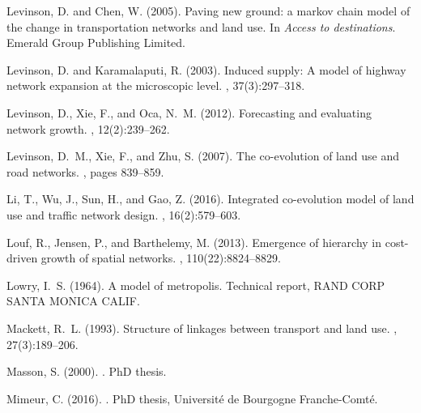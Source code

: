 \documentclass[10pt]{article}
\begin{document}
\begin{thebibliography}{}
Levinson, D. and Chen, W. (2005).
\newblock Paving new ground: a markov chain model of the change in
  transportation networks and land use.
\newblock In {\em Access to destinations}. Emerald Group Publishing Limited.

Levinson, D. and Karamalaputi, R. (2003).
\newblock Induced supply: A model of highway network expansion at the
  microscopic level.
,
  37(3):297--318.

Levinson, D., Xie, F., and Oca, N.~M. (2012).
\newblock Forecasting and evaluating network growth.
, 12(2):239--262.

Levinson, D.~M., Xie, F., and Zhu, S. (2007).
\newblock The co-evolution of land use and road networks.
, pages 839--859.

Li, T., Wu, J., Sun, H., and Gao, Z. (2016).
\newblock Integrated co-evolution model of land use and traffic network design.
, 16(2):579--603.

Louf, R., Jensen, P., and Barthelemy, M. (2013).
\newblock Emergence of hierarchy in cost-driven growth of spatial networks.
,
  110(22):8824--8829.

Lowry, I.~S. (1964).
\newblock A model of metropolis.
\newblock Technical report, RAND CORP SANTA MONICA CALIF.

Mackett, R.~L. (1993).
\newblock Structure of linkages between transport and land use.
, 27(3):189--206.

Masson, S. (2000).
.
\newblock PhD thesis.

Mimeur, C. (2016).
.
\newblock PhD thesis, {Universit{\'e} de Bourgogne Franche-Comt{\'e}}.


\end{thebibliography}
\end{document}
